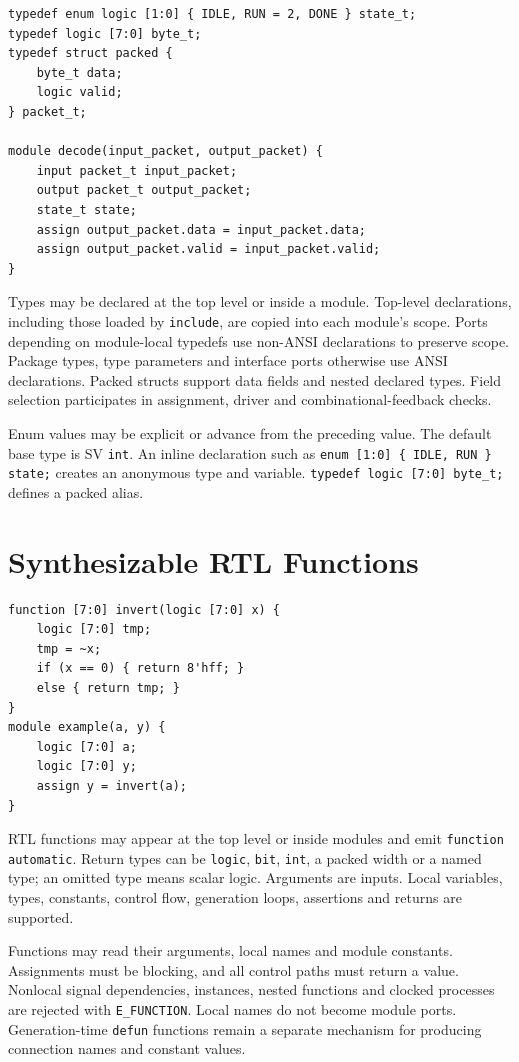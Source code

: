 \documentclass[lang=en,11pt]{elegantbook}
\newcommand{\code}[1]{\texttt{#1}}
\begin{document}
\begin{lstlisting}[language=Slip]
typedef enum logic [1:0] { IDLE, RUN = 2, DONE } state_t;
typedef logic [7:0] byte_t;
typedef struct packed {
    byte_t data;
    logic valid;
} packet_t;

module decode(input_packet, output_packet) {
    input packet_t input_packet;
    output packet_t output_packet;
    state_t state;
    assign output_packet.data = input_packet.data;
    assign output_packet.valid = input_packet.valid;
}
\end{lstlisting}

Types may be declared at the top level or inside a module. Top-level declarations,
including those loaded by \code{include}, are copied into each module's scope.
Ports depending on module-local typedefs use non-ANSI declarations to preserve scope. Package types, type parameters and interface ports otherwise use ANSI declarations.
Packed structs support data fields and nested declared types. Field selection
participates in assignment, driver and combinational-feedback checks.

Enum values may be explicit or advance from the preceding value. The default
base type is SV \code{int}. An inline declaration such as
\code{enum [1:0] \{ IDLE, RUN \} state;} creates an anonymous type and variable.
\code{typedef logic [7:0] byte\_t;} defines a packed alias.

\section{Synthesizable RTL Functions}

\begin{lstlisting}[language=Slip]
function [7:0] invert(logic [7:0] x) {
    logic [7:0] tmp;
    tmp = ~x;
    if (x == 0) { return 8'hff; }
    else { return tmp; }
}
module example(a, y) {
    logic [7:0] a;
    logic [7:0] y;
    assign y = invert(a);
}
\end{lstlisting}

RTL functions may appear at the top level or inside modules and emit
\code{function automatic}. Return types can be \code{logic}, \code{bit},
\code{int}, a packed width or a named type; an omitted type means scalar logic.
Arguments are inputs. Local variables, types, constants, control flow,
generation loops, assertions and returns are supported.

Functions may read their arguments, local names and module constants. Assignments
must be blocking, and all control paths must return a value. Nonlocal signal
dependencies, instances, nested functions and clocked processes are rejected with
\code{E\_FUNCTION}. Local names do not become module ports.
Generation-time \code{defun} functions remain a separate mechanism for producing
connection names and constant values.
\end{document}
